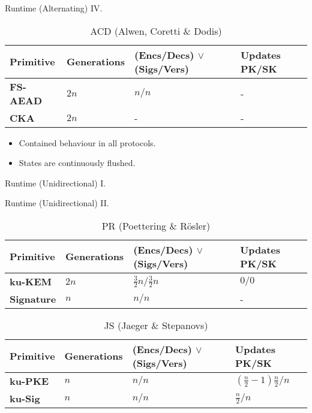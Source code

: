 \documentclass{beamer}
\begin{document}
\begin{frame}{Runtime (Alternating) IV.}
  \scriptsize
  \begin{table}
    \caption*{ACD (Alwen, Coretti \& Dodis)}
    \begin{tabular}{ | l | l | l | l |}
      \hline
      Primitive & Generations & (Encs/Decs) $\vee$ (Sigs/Vers) & Updates PK/SK \\ \hline
      \textbf{FS-AEAD} & $2n$ & $n/n$ & - \\ \hline
      \textbf{CKA} & $2n$ & - & - \\  
      \hline
    \end{tabular}
  \end{table}
  \normalsize
  \begin{itemize}
  \item Contained behaviour in all protocols.
  \item States are continuously flushed.
  \end{itemize}
\end{frame}

\begin{frame}{Runtime (Unidirectional) I.}
  \begin{figure}[H]
    \centering
     
  \end{figure}
\end{frame}

\begin{frame}{Runtime (Unidirectional) II.}
  \scriptsize
  \begin{table}
    \caption*{PR (Poettering \& Rösler)}
    \begin{tabular}{ | l | l | l | l |}
    \hline
    Primitive & Generations & (Encs/Decs) $\vee$ (Sigs/Vers) & Updates PK/SK \\ \hline
    \textbf{ku-KEM} & $2n$ & $\frac{3}{2}n/\frac{3}{2}n$ & $0/0$ \\ \hline
    \textbf{Signature} & $n$ & $n/n$ & - \\  
    \hline
    \end{tabular}
  \end{table}
  \begin{table}
    \caption*{JS (Jaeger \& Stepanovs)}
    \begin{tabular}{ | l | l | l | l |}
    \hline
    Primitive & Generations & (Encs/Decs) $\vee$ (Sigs/Vers) & Updates PK/SK \\ \hline
    \textbf{ku-PKE} & $n$ & $n/n$ & $(\frac{n}{2}-1)\frac{n}{2}/n$ \\ \hline
    \textbf{ku-Sig} & $n$ & $n/n$ & $\frac{n}{2}/n$ \\  
    \hline
    \end{tabular}
  \end{table}
\end{frame}
\end{document}
